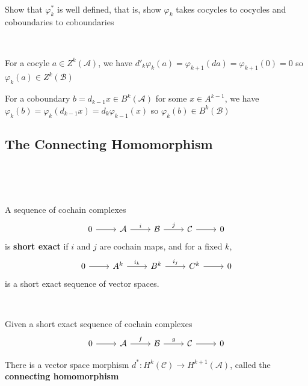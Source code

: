 \documentclass{article}
\begin{document}
\begin{proposition}
  \

  Show that $\varphi^*_k$ is well defined, that is, show $\varphi_k$ takes cocycles to cocycles and coboundaries to coboundaries
\end{proposition}

\begin{customproof}
  \

  For a cocyle $a \in Z^k(\mathcal{A})$, we have $d'_k\varphi_k(a) = \varphi_{k+1}(da) = \varphi_{k+1}(0) = 0$ so $\varphi_k(a) \in Z^k(\mathcal{B})$

  For a coboundary $b = d_{k-1}x \in B^k(\mathcal{A})$ for some $x \in A^{k-1}$, we have $\varphi_k(b) = \varphi_k(d_{k-1}x) = d_k\varphi_{k-1}(x)$ so $\varphi_k(b) \in B^k(\mathcal{B})$
\end{customproof}

\subsection{The Connecting Homomorphism}
\

\begin{definition}
  \

  A sequence of cochain complexes \[
    \begin{tikzcd}
      0 & \mathcal{A} & \mathcal{B} & \mathcal{C} & 0
      \arrow[from=1-1, to=1-2]
      \arrow[from=1-2, to=1-3, "i"]
      \arrow[from=1-3, to=1-4, "j"]
      \arrow[from=1-4, to=1-5]
  \end{tikzcd}\] is \textbf{short exact} if $i$ and $j$ are cochain maps, and for a fixed $k$, \[
    \begin{tikzcd}
      0 & A^k & B^k & C^k & 0
      \arrow[from=1-1, to=1-2]
      \arrow[from=1-2, to=1-3, "i_k"]
      \arrow[from=1-3, to=1-4, "i_j"]
      \arrow[from=1-4, to=1-5]
  \end{tikzcd}\]is a short exact sequence of vector spaces.

\end{definition}

\begin{proposition}
  \

  Given a short exact sequence of cochain complexes \[
    \begin{tikzcd}
      0 & \mathcal{A} & \mathcal{B} & \mathcal{C} & 0
      \arrow[from=1-1, to=1-2]
      \arrow[from=1-2, to=1-3, "f"]
      \arrow[from=1-3, to=1-4, "g"]
      \arrow[from=1-4, to=1-5]
  \end{tikzcd}\]

  There is a vector space morphism $d^*: H^k(\mathcal{C}) \to H^{k+1}(\mathcal{A})$, called the \textbf{connecting homomorphism}
\end{proposition}
\end{document}
